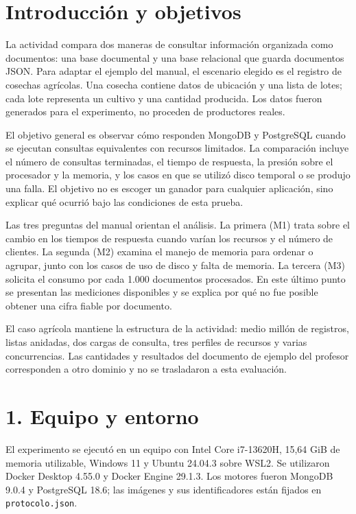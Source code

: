 \documentclass[12pt,letterpaper]{article}
\begin{document}
\section*{Introducción y objetivos}
La actividad compara dos maneras de consultar información organizada como documentos: una base documental y una base relacional que guarda documentos JSON. Para adaptar el ejemplo del manual, el escenario elegido es el registro de cosechas agrícolas. Una cosecha contiene datos de ubicación y una lista de lotes; cada lote representa un cultivo y una cantidad producida. Los datos fueron generados para el experimento, no proceden de productores reales.

El objetivo general es observar cómo responden MongoDB y PostgreSQL cuando se ejecutan consultas equivalentes con recursos limitados. La comparación incluye el número de consultas terminadas, el tiempo de respuesta, la presión sobre el procesador y la memoria, y los casos en que se utilizó disco temporal o se produjo una falla. El objetivo no es escoger un ganador para cualquier aplicación, sino explicar qué ocurrió bajo las condiciones de esta prueba.

Las tres preguntas del manual orientan el análisis. La primera (M1) trata sobre el cambio en los tiempos de respuesta cuando varían los recursos y el número de clientes. La segunda (M2) examina el manejo de memoria para ordenar o agrupar, junto con los casos de uso de disco y falta de memoria. La tercera (M3) solicita el consumo por cada 1.000 documentos procesados. En este último punto se presentan las mediciones disponibles y se explica por qué no fue posible obtener una cifra fiable por documento.

El caso agrícola mantiene la estructura de la actividad: medio millón de registros, listas anidadas, dos cargas de consulta, tres perfiles de recursos y varias concurrencias. Las cantidades y resultados del documento de ejemplo del profesor corresponden a otro dominio y no se trasladaron a esta evaluación.

\section*{1. Equipo y entorno}
El experimento se ejecutó en un equipo con Intel Core i7-13620H, 15,64 GiB de memoria utilizable, Windows 11 y Ubuntu 24.04.3 sobre WSL2. Se utilizaron Docker Desktop 4.55.0 y Docker Engine 29.1.3. Los motores fueron MongoDB 9.0.4 y PostgreSQL 18.6; las imágenes y sus identificadores están fijados en \texttt{protocolo.json}.
\end{document}
